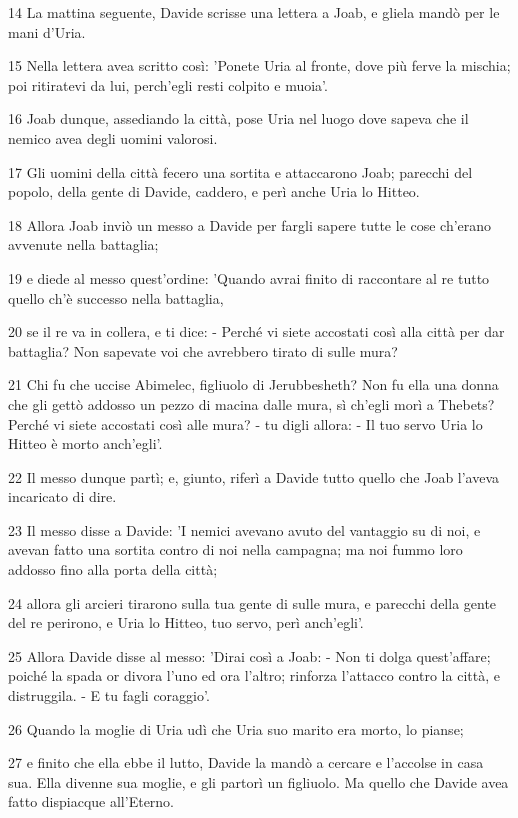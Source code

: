 \par 14 La mattina seguente, Davide scrisse una lettera a Joab, e gliela mandò per le mani d'Uria.
\par 15 Nella lettera avea scritto così: 'Ponete Uria al fronte, dove più ferve la mischia; poi ritiratevi da lui, perch'egli resti colpito e muoia'.
\par 16 Joab dunque, assediando la città, pose Uria nel luogo dove sapeva che il nemico avea degli uomini valorosi.
\par 17 Gli uomini della città fecero una sortita e attaccarono Joab; parecchi del popolo, della gente di Davide, caddero, e perì anche Uria lo Hitteo.
\par 18 Allora Joab inviò un messo a Davide per fargli sapere tutte le cose ch'erano avvenute nella battaglia;
\par 19 e diede al messo quest'ordine: 'Quando avrai finito di raccontare al re tutto quello ch'è successo nella battaglia,
\par 20 se il re va in collera, e ti dice: - Perché vi siete accostati così alla città per dar battaglia? Non sapevate voi che avrebbero tirato di sulle mura?
\par 21 Chi fu che uccise Abimelec, figliuolo di Jerubbesheth? Non fu ella una donna che gli gettò addosso un pezzo di macina dalle mura, sì ch'egli morì a Thebets? Perché vi siete accostati così alle mura? - tu digli allora: - Il tuo servo Uria lo Hitteo è morto anch'egli'.
\par 22 Il messo dunque partì; e, giunto, riferì a Davide tutto quello che Joab l'aveva incaricato di dire.
\par 23 Il messo disse a Davide: 'I nemici avevano avuto del vantaggio su di noi, e avevan fatto una sortita contro di noi nella campagna; ma noi fummo loro addosso fino alla porta della città;
\par 24 allora gli arcieri tirarono sulla tua gente di sulle mura, e parecchi della gente del re perirono, e Uria lo Hitteo, tuo servo, perì anch'egli'.
\par 25 Allora Davide disse al messo: 'Dirai così a Joab: - Non ti dolga quest'affare; poiché la spada or divora l'uno ed ora l'altro; rinforza l'attacco contro la città, e distruggila. - E tu fagli coraggio'.
\par 26 Quando la moglie di Uria udì che Uria suo marito era morto, lo pianse;
\par 27 e finito che ella ebbe il lutto, Davide la mandò a cercare e l'accolse in casa sua. Ella divenne sua moglie, e gli partorì un figliuolo. Ma quello che Davide avea fatto dispiacque all'Eterno.

